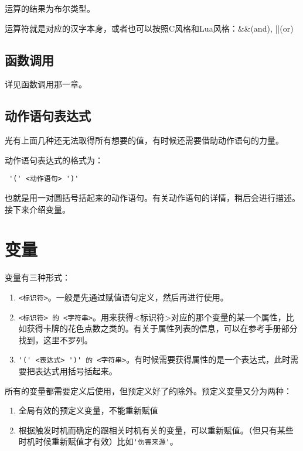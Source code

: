 运算的结果为布尔类型。

运算符就是对应的汉字本身，或者也可以按照C风格和Lua风格：\&\&(and), ||(or)

\subsection{函数调用}

详见函数调用那一章。

\subsection{动作语句表达式}

光有上面几种还无法取得所有想要的值，有时候还需要借助动作语句的力量。

动作语句表达式的格式为：

\begin{verbatim}
 '(' <动作语句> ')'
\end{verbatim}

也就是用一对圆括号括起来的动作语句。有关动作语句的详情，稍后会进行描述。\\

接下来介绍变量。

\section{变量}

变量有三种形式：

\begin{enumerate}
 \item \verb|<标识符>|。一般是先通过赋值语句定义，然后再进行使用。
 \item \verb|<标识符> 的 <字符串>|。用来获得<标识符>对应的那个变量的某一个属性，比如获得卡牌的花色点数之类的。有关于属性列表的信息，可以在参考手册部分找到，这里不罗列。
 \item \verb|'(' <表达式> ')' 的 <字符串>|。有时候需要获得属性的是一个表达式，此时需要把表达式用括号括起来。
\end{enumerate}

所有的变量都需要定义后使用，但预定义好了的除外。预定义变量又分为两种：

\begin{enumerate}
 \item 全局有效的预定义变量，不能重新赋值
 \item 根据触发时机而确定的跟相关时机有关的变量，可以重新赋值。（但只有某些时机时候重新赋值才有效）比如\verb|'伤害来源'|。
\end{enumerate}

